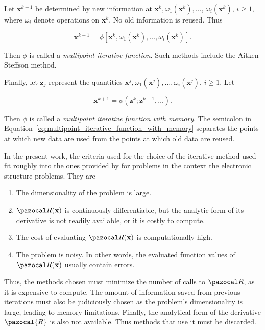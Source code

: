 Let \(\mathbf x^{k+1}\) be determined by new information at \(\mathbf x^{k}, \omega_{1}\left(\mathbf x^{k}\right), \ldots\), \(\omega_{i}\left(\mathbf x^{k}\right)\), \(i \geq 1\), where \(\omega_i\) denote operations on \(\mathbf x^k\).
No old information is reused.
Thus
\begin{highlight}
  \begin{equation}
    \mathbf x^{k+1}=\phi\left[\mathbf x^{k}, \omega_{1}\left(\mathbf x^{k}\right), \ldots, \omega_{i}\left(\mathbf x^{k}\right)\right].
  \end{equation}
\end{highlight}
Then \(\phi\) is called a \textit{multipoint iterative function}.
Such methods include the Aitken-Steffson method.

Finally, let \(\mathbf z_{j}\) represent the quantities \(\mathbf x^{j}, \omega_{1}\left(\mathbf x^{j}\right), \ldots, \omega_{i}\left(\mathbf x^{j}\right)\), \(i \geq 1\).
Let
\begin{highlight}
  \begin{equation} \label{eq:multipoint_iterative_function_with_memory}
  \mathbf x^{k+1}=\phi\left(\mathbf z^{k} ; \mathbf z^{k-1}, \dots \right) .
  \end{equation}
\end{highlight}
Then \(\phi\) is called a \textit{multipoint iterative function with memory}.
The semicolon in Equation~\eqref{eq:multipoint_iterative_function_with_memory} separates the points at which new data are used from the points at which old data are reused.

In the present work, the criteria used for the choice of the iterative method used fit roughly into the ones provided by \cite{fang_two_2009} for problems in the context the electronic structure problems.
They are
\begin{enumerate}
  \item The dimensionality of the problem is large.
  \item \(\pazocal R(\mathbf x)\) is continuously differentiable, but the analytic form of its derivative is not readily available, or it is costly to compute.
  \item The cost of evaluating \(\pazocal R(\mathbf x)\) is computationally high.
  \item The problem is noisy. In other words, the evaluated function values of \(\pazocal R(\mathbf x)\) usually contain errors.
\end{enumerate}
Thus, the methods chosen must minimize the number of calls to \(\pazocal R\), as it is expensive to compute.
The amount of information saved from previous iterations must also be judiciously chosen as the problem's dimensionality is large, leading to memory limitations.
Finally, the analytical form of the derivative \(\pazocal{R}\) is also not available.
Thus methods that use it must be discarded.

